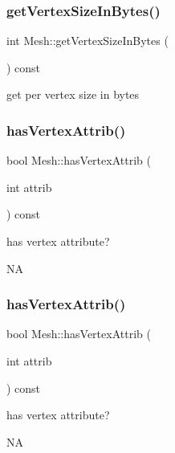 \subsubsection{\texorpdfstring{get\+Vertex\+Size\+In\+Bytes()}{getVertexSizeInBytes()}\hspace{0.1cm}{\footnotesize\ttfamily [2/2]}}
{\footnotesize\ttfamily int Mesh\+::get\+Vertex\+Size\+In\+Bytes (\begin{DoxyParamCaption}{ }\end{DoxyParamCaption}) const}

get per vertex size in bytes \mbox{\label{classMesh_adb4449d816ec9935e576cdf99a18b7c1}} 
\subsubsection{\texorpdfstring{has\+Vertex\+Attrib()}{hasVertexAttrib()}\hspace{0.1cm}{\footnotesize\ttfamily [1/2]}}
{\footnotesize\ttfamily bool Mesh\+::has\+Vertex\+Attrib (\begin{DoxyParamCaption}\item[{int}]{attrib }\end{DoxyParamCaption}) const}

has vertex attribute?

NA \mbox{\label{classMesh_adb4449d816ec9935e576cdf99a18b7c1}} 
\subsubsection{\texorpdfstring{has\+Vertex\+Attrib()}{hasVertexAttrib()}\hspace{0.1cm}{\footnotesize\ttfamily [2/2]}}
{\footnotesize\ttfamily bool Mesh\+::has\+Vertex\+Attrib (\begin{DoxyParamCaption}\item[{int}]{attrib }\end{DoxyParamCaption}) const}

has vertex attribute?

NA \mbox{\label{classMesh_aac7eb18692391478f6bbb0a9937b86fd}} 
